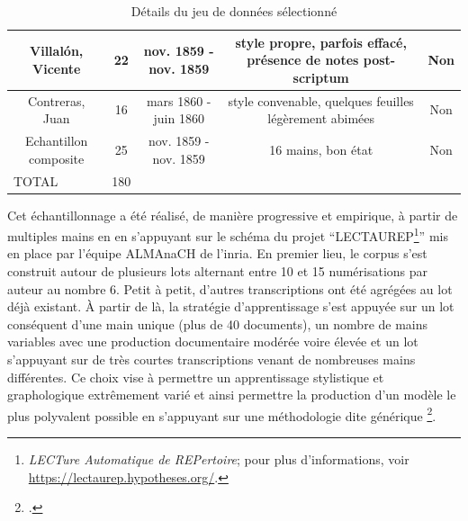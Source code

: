 \begin{table}[h!]
\begin{adjustbox}{max width=1\textwidth}
\begin{tabular}{|c|c|ccc}
    Villalón, Vicente                  & 22                                              & \multicolumn{1}{c|}{nov. 1859 - nov. 1859} & \multicolumn{1}{c|}{style propre, parfois effacé, présence de notes post-scriptum}                   & \multicolumn{1}{c|}{Non}                   \\ \hline
    Contreras, Juan                    & 16                                              & \multicolumn{1}{c|}{mars 1860 - juin 1860}         & \multicolumn{1}{c|}{style convenable, quelques feuilles légèrement abimées}                          & \multicolumn{1}{c|}{Non}                   \\ \hline
    Echantillon composite              & 25                                              & \multicolumn{1}{c|}{nov. 1859 - nov. 1859} & \multicolumn{1}{c|}{16 mains, bon état}                                                              & \multicolumn{1}{c|}{Non}                  \\ \hline
    \multicolumn{1}{|l|}{TOTAL}        & \multicolumn{1}{l|}{180}                        & \multicolumn{3}{l}{\cellcolor[HTML]{C0C0C0}{\color[HTML]{9B9B9B} }}                                                                                                                                    \\ \cline{1-2}
    \end{tabular}
    \end{adjustbox}
    \caption{Détails du jeu de données sélectionné}
    \label{tab:dataset}
    \end{table}

	
	Cet échantillonnage a été réalisé, de manière progressive et empirique, à partir de multiples mains en en s'appuyant sur le schéma du projet \enquote{LECTAUREP\footnote{\textit{LECTure Automatique de REPertoire}; pour plus d'informations, voir \url{https://lectaurep.hypotheses.org/}.}} mis en place par l'équipe ALMAnaCH de l'\gls{inria}. En premier lieu, le corpus s'est construit autour de plusieurs lots alternant entre 10 et 15 numérisations par auteur au nombre 6. Petit à petit, d'autres transcriptions ont été agrégées au lot déjà existant. À partir de là, la stratégie d'apprentissage s'est appuyée sur un lot conséquent d'une main unique (plus de 40 documents), un nombre de mains variables avec une production documentaire modérée voire élevée et un lot s'appuyant sur de très courtes transcriptions venant de nombreuses mains différentes. Ce choix vise à permettre un apprentissage stylistique et graphologique extrêmement varié et ainsi permettre la production d'un modèle le plus polyvalent possible en s'appuyant sur une méthodologie dite générique \footcite{pincheCREMMALabProjectHandwritten2022}.
	
